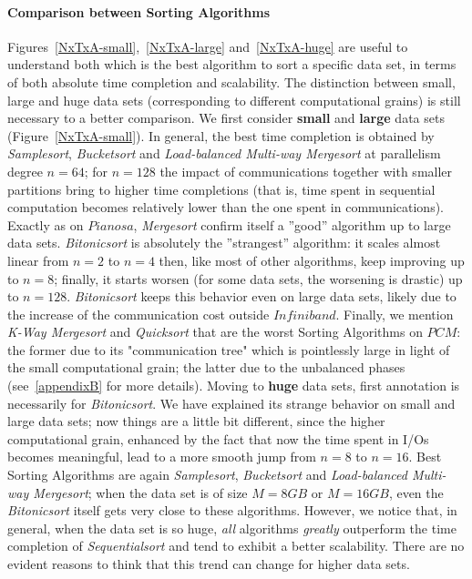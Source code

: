 \paragraph{Comparison between Sorting Algorithms}
Figures~\ref{NxTxA-small},~\ref{NxTxA-large} and~\ref{NxTxA-huge} are useful to understand both which is the best algorithm to sort a specific data set, in terms of both absolute time completion and scalability. The distinction between small, large and huge data sets (corresponding to different computational grains) is still necessary to a better comparison. We first consider \textbf{small} and \textbf{large} data sets (Figure~\ref{NxTxA-small}). In general, the best time completion is obtained by \textit{Samplesort}, \textit{Bucketsort} and \textit{Load-balanced Multi-way Mergesort} at parallelism degree $n=64$; for $n=128$ the impact of communications together with smaller partitions bring to higher time completions (that is, time spent in sequential computation becomes relatively lower than the one spent in communications). Exactly as on $Pianosa$, \textit{Mergesort} confirm itself a ''good'' algorithm up to large data sets. \textit{Bitonicsort} is absolutely the ''strangest'' algorithm: it scales almost linear from $n=2$ to $n=4$ then, like most of other algorithms, keep improving up to $n=8$; finally, it starts worsen (for some data sets, the worsening is drastic) up to $n=128$. \textit{Bitonicsort} keeps this behavior even on large data sets, likely due to the increase of the communication cost outside $Infiniband$. Finally, we mention \textit{K-Way Mergesort} and \textit{Quicksort} that are the worst Sorting Algorithms on $PCM$: the former due to its "communication tree" which is pointlessly large in light of the small computational grain; the latter due to the unbalanced phases (see~\ref{appendixB} for more details). Moving to \textbf{huge} data sets, first annotation is necessarily for \textit{Bitonicsort}. We have explained its strange behavior on small and large data sets; now things are a little bit different, since the higher computational grain, enhanced by the fact that now the time spent in I/Os becomes meaningful, lead to a more smooth jump from $n=8$ to $n=16$. Best Sorting Algorithms are again \textit{Samplesort}, \textit{Bucketsort} and \textit{Load-balanced Multi-way Mergesort}; when the data set is of size $M=8GB$ or $M=16GB$, even the \textit{Bitonicsort} itself gets very close to these algorithms. However, we notice that, in general, when the data set is so huge, \textit{all} algorithms \textit{greatly} outperform the time completion of \textit{Sequentialsort} and tend to exhibit a better scalability. There are no evident reasons to think that this trend can change for higher data sets.

